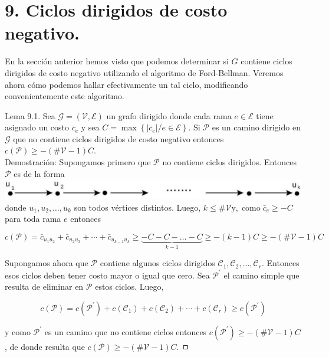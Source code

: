 \documentclass[10pt]{article}
\begin{document}
\section*{9. Ciclos dirigidos de costo negativo.}
En la sección anterior hemos visto que podemos determinar si $G$ contiene ciclos dirigidos de costo negativo utilizando el algoritmo de Ford-Bellman. Veremos ahora cómo podemos hallar efectivamente un tal ciclo, modificando convenientemente este algoritmo.

Lema 9.1. Sea $\mathcal{G}=(\mathcal{V}, \mathcal{E})$ un grafo dirigido donde cada rama $e \in \mathcal{E}$ tiene asignado un costo $\bar{c}_{e}$ y sea $C=\max \left\{\left|\bar{c}_{e}\right| / e \in \mathcal{E}\right\}$. Si $\mathcal{P}$ es un camino dirigido en $\mathcal{G}$ que no contiene ciclos dirigidos de costo negativo entonces $c(\mathcal{P}) \geq-(\# \mathcal{V}-1) C$.\\
Demostración: Supongamos primero que $\mathcal{P}$ no contiene ciclos dirigidos. Entonces $\mathcal{P}$ es de la forma\\
\includegraphics[max width=\textwidth, center]{2025_09_05_93c7c1835f249f70c0eeg-38}\\
donde $u_{1}, u_{2}, \ldots, u_{k}$ son todos vértices distintos. Luego, $k \leq \# \mathcal{V} \mathrm{y}, \operatorname{como} \bar{c}_{e} \geq-C$ para toda rama $e$ entonces

$$
c(\mathcal{P})=\bar{c}_{u_{1} u_{2}}+\bar{c}_{u_{2} u_{3}}+\cdots+\bar{c}_{u_{k-1} u_{k}} \geq \underbrace{-C-C-\ldots-C}_{k-1} \geq-(k-1) C \geq-(\# \mathcal{V}-1) C
$$

Supongamos ahora que $\mathcal{P}$ contiene algunos ciclos dirigidos $\mathcal{C}_{1}, \mathcal{C}_{2}, \ldots, \mathcal{C}_{r}$. Entonces esos ciclos deben tener costo mayor o igual que cero. Sea $\mathcal{P}^{\prime}$ el camino simple que resulta de eliminar en $\mathcal{P}$ estos ciclos. Luego,

$$
c(\mathcal{P})=c\left(\mathcal{P}^{\prime}\right)+c\left(\mathcal{C}_{1}\right)+c\left(\mathcal{C}_{2}\right)+\cdots+c\left(\mathcal{C}_{r}\right) \geq c\left(\mathcal{P}^{\prime}\right)
$$

y como $\mathcal{P}^{\prime}$ es un camino que no contiene ciclos entonces $c\left(\mathcal{P}^{\prime}\right) \geq-(\# \mathcal{V}-1) C$, de donde resulta que $c(\mathcal{P}) \geq-(\# \mathcal{V}-1) C$. ㅁ
\end{document}
